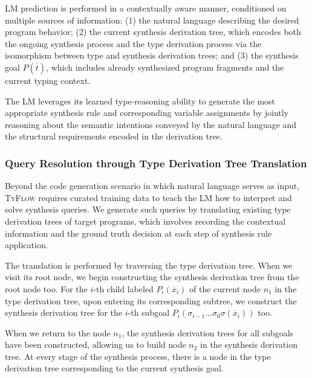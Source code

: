 \documentclass[manuscript,screen]{acmart}
\newcommand{\toolname}[1]{\textsc{#1}}
\newcommand{\mainname}{\toolname{TyFlow}\xspace}
\begin{document}
LM prediction is performed in a contextually aware manner, conditioned on multiple sources of information: (1) the natural language describing the desired program behavior; (2) the current synthesis derivation tree, which encodes both the ongoing synthesis process and the type derivation process via the isomorphism between type and synthesis derivation trees; and (3) the synthesis goal $P(\overline{t})$, which includes already synthesized program fragments and the current typing context.

The LM leverages its learned type-reasoning ability to generate the most appropriate synthesis rule and corresponding variable assignments by jointly reasoning about the semantic intentions conveyed by the natural language and the structural requirements encoded in the derivation tree. 

\subsubsection{Query Resolution through Type Derivation Tree Translation}
\label{sec:translation}
Beyond the code generation scenario in which natural language serves as input, \mainname requires curated training data to teach the LM how to interpret and solve synthesis queries. 
We generate such queries by translating existing type derivation trees of target programs, which involves recording the contextual information and the ground truth decision at each step of synthesis rule application.

The translation is performed by traversing the type derivation tree. When we visit its root node, we begin constructing the synthesis derivation tree from the root node too. 
For the $i$-th child labeled $P_i(\overline{x}_i)$ of the current node $n_1$ in the type derivation tree, upon entering its corresponding subtree, we construct the synthesis derivation tree for the $i$-th subgoal $P_i(\sigma_{i-1} \ldots \sigma_0 \sigma(\overline{x}_i))$ too.

When we return to the node $n_1$, the synthesis derivation trees for all subgoals have been constructed, allowing us to build node $n_2$ in the synthesis derivation tree. At every stage of the synthesis process, there is a node in the type derivation tree corresponding to the current synthesis goal.
\end{document}
